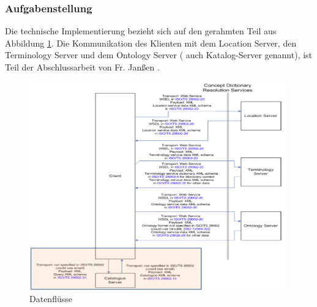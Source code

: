 \subsubsection{Aufgabenstellung}

Die technische Implementierung bezieht sich auf den gerahmten Teil aus Abbildung \ref{fig:datenfluesse}. Die Kommunikation des Klienten mit dem Location Server, den Terminology Server und dem Ontology Server (
auch Katalog-Server genannt), ist Teil der Abschlussarbeit von Fr. Janßen \citep[Vergl.][]{janssen}. 

\begin{figure}[htbp]
	\centering
		\includegraphics[width=0.99\textwidth]{images/datenfluesse_plib.png}
	\caption{Datenflüsse}
	\label{fig:datenfluesse}
\end{figure}




